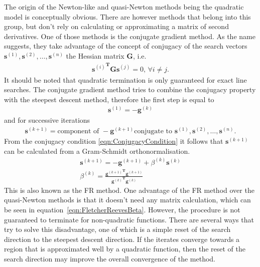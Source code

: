 The origin of the Newton-like and quasi-Newton methods being the quadratic
model is conceptually obvious. There are however methods that belong into this
group, but don't rely on calculating or approximating a matrix of second
derivatives. One of those methods is the conjugate gradient method.  As the
name suggests, they take advantage of the concept of conjugacy of the search
vectors $\mathbf{s}^{(1)},\mathbf{s}^{(2)},\dots,\mathbf{s}^{(n)}$ the Hessian
matrix $\mathbf{G}$, i.e.
%
\begin{align}
    {\mathbf{s}^{(i)}}^\mathbf{T}\mathbf{G}\mathbf{s}^{(j)}=0,\,\forall i\neq j.\label{eqn:ConjugacyCondition}
\end{align}
%
It should be noted that quadratic termination is only guaranteed for exact line
searches. The conjugate gradient method tries to combine the conjugacy property
with the steepest descent method, therefore the first step is equal to
%
\begin{align}
    \mathbf{s}^{(1)}=-\mathbf{g}^{(k)}
\end{align}
%
and for successive iterations
%
\begin{align}
    \mathbf{s}^{(k+1)}=\text{component of }-\mathbf{g}^{(k+1)}\text{conjugate to }\mathbf{s}^{(1)},\mathbf{s}^{(2)},\dots,\mathbf{s}^{(n)}.
\end{align}
%
From the conjugacy condition \eqref{eqn:ConjugacyCondition} it follows that $\mathbf{s}^{(k+1)}$ can be calculated from a Gram-Schmidt orthonormalisation.
%
\begin{align}
    \mathbf{s}^{(k+1)}=-\mathbf{g}^{(k+1)}+\beta^{(k)}\mathbf{s}^{(k)}\\
    \beta^{(k)}=\frac{{\mathbf{g}^{(k+1)}}^\mathbf{T}\mathbf{g}^{(k+1)}}{{\mathbf{g}^{(k)}}^\mathbf{T}\mathbf{g}^{(k)}}\label{eqn:FletcherReevesBeta}
\end{align}
%
This is also known as the \ac{FR}
method.\autocite{Fletcher_Functionminimizationconjugate_1964} One advantage of
the \ac{FR} method over the quasi-Newton methods is that it doesn't need any
matrix calculation, which can be seen in
equation~\eqref{eqn:FletcherReevesBeta}. However, the procedure is not
guaranteed to terminate for non-quadratic functions. There are several ways
that try to solve this disadvantage, one of which is a simple reset of the
search direction to the steepest descent direction. If the iterates converge
towards a region that is approximated well by a quadratic function, then the
reset of the search direction may improve the overall convergence of the
method.

